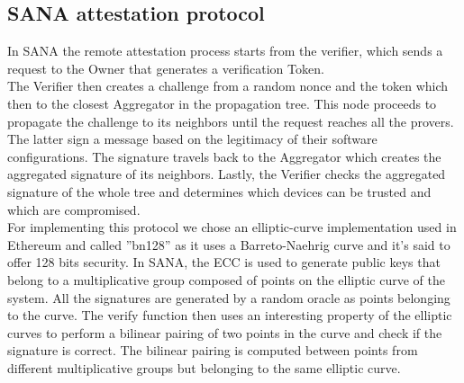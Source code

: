 \subsection{SANA attestation protocol}
In SANA the remote attestation process starts from the verifier, which sends a request to the Owner that generates a verification Token. \\
The Verifier then creates a challenge from a random nonce and the token which then to the closest Aggregator in the propagation tree.
This node proceeds to propagate the challenge to its neighbors until the request reaches all the provers.
The latter sign a message based on the legitimacy of their software configurations. 
The signature travels back to the Aggregator which creates the aggregated signature of its neighbors. 
Lastly, the Verifier checks the aggregated signature of the whole tree and determines which devices
can be trusted and which are compromised.\\
For implementing this protocol we chose an elliptic-curve implementation used in Ethereum and called ''bn128'' as it uses a Barreto-Naehrig curve and it's said to offer 128 bits security.
In SANA, the ECC is used to generate public keys that belong to a multiplicative group composed of points on the elliptic curve of the system.
All the signatures are generated by a random oracle as points belonging to the curve. 
The verify function then uses an interesting property of the elliptic curves to perform a bilinear pairing of two points in the curve and check if the signature is correct.
The bilinear pairing is computed between points from different multiplicative groups but belonging to the same elliptic curve.